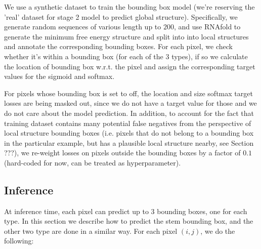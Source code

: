 \documentclass[12pt]{article}
\begin{document}
We use a synthetic dataset to train the bounding box model (we're reserving the 'real' dataset for stage 2 model to predict global structure).
Specifically, we generate random sequences of various length up to $200$, and use RNAfold to generate the
minimum free energy structure and split into into local structures and annotate the corresponding bounding boxes.
For each pixel, we check whether it's within a bounding box (for each of the $3$ types),
if so we calculate the location of bounding box w.r.t. the pixel and assign the corresponding target values for the sigmoid and softmax.

For pixels whose bounding box is set to off, the location and size softmax target losses are being masked out,
since we do not have a target value for those and we do not care about the model prediction.
In addition, to account for the fact that training dataset contains many potential false negatives
from the perspective of local structure bounding boxes
(i.e. pixels that do not belong to a bounding box in the particular example, but has a plausible local structure nearby, see Section ???),
we re-weight losses on pixels outside the bounding boxes by a factor of $0.1$ (hard-coded for now, can be treated as hyperparameter).



\subsection{Inference} \label{sec:inference}

At inference time, each pixel can predict up to $3$ bounding boxes, one for each type.
In this section we describe how to predict the stem bounding box, and the other two type are done in a similar way.
For each pixel $(i, j)$, we do the following:
\end{document}
